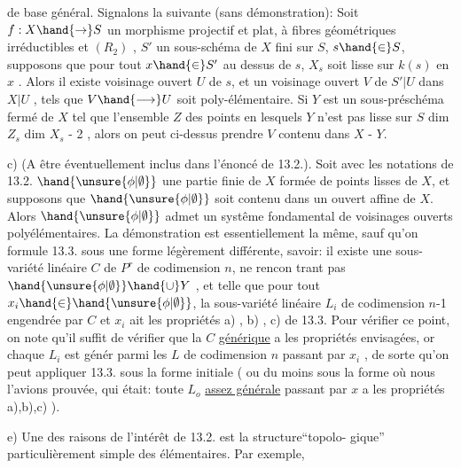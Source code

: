 
de base général. Signalons la suivante (sans démonstration): Soit $f:X\hand{\to} S$
un morphisme projectif et plat,  à fibres géométriques
 irréductibles et $(R_2)$ , $S'$ un sous-schéma de $X$ fini sur $S$,
$s\hand{\in} S$, supposons que pour tout $x\hand{\in} S'$ au dessus de $s$, $X_s$ soit lisse sur
$k(s)$ en $x$ . Alors il existe  voisinage ouvert $U$ de $s$, et un voisinage
ouvert $V$ de $S'|U$ dans $X|U$ , tels que $V\hand{\longrightarrow} U$ soit poly-élémentaire.
Si $Y$ est un sous-préschéma fermé de $X$ tel que l'ensemble $Z$ des points
en lesquels $Y$ n'est pas lisse sur $S$   
dim $Z_s$ \hand{$\leq$} dim $X_s$ - 2 , alors on peut ci-dessus prendre $V$ contenu dans
$X$ - $Y$.

c) (A être éventuellement inclus dans l'énoncé de 13.2.). Soit
avec les notations de 13.2. $\hand{\unsure{\phi|\emptyset}}$ une partie finie de $X$ formée de points
lisses de $X$, et supposons que $\hand{\unsure{\phi|\emptyset}}$ soit contenu dans un  ouvert affine
de $X$. Alors $\hand{\unsure{\phi|\emptyset}}$ admet un systême fondamental de voisinages ouverts
polyélémentaires.  La démonstration est essentiellement la même, sauf
qu'on formule 13.3. sous une forme légèrement différente, savoir: il
existe une sous-variété linéaire $C$ de $P^r$ de codimension $n$, ne rencon%
trant pas $\hand{\unsure{\phi|\emptyset}}\hand{\cup} Y$ , et telle que pour tout $x_i\hand{\in}\hand{\unsure{\phi|\emptyset}}$, la sous-variété
linéaire $L_i$ de codimension $n$-1 engendrée par $C$ et $x_i$ ait les propriétés
a) , b) , c) de 13.3. Pour vérifier ce point, on note qu'il suffit de
vérifier que la $C$ \uline{générique} a les propriétés envisagées, or  
 chaque $L_i$ est génér parmi les $L$ de codimension $n$ passant
par $x_i$ , de sorte qu'on peut appliquer 13.3. sous la forme initiale
( ou du moins sous la forme où nous l'avions prouvée, qui était: toute
$L_o$ \uline{assez générale} passant par $x$ a les propriétés a),b),c) ).

e) Une des raisons de l'intérêt de 13.2. est la structure``topolo-%
gique'' particulièrement simple des   élémentaires. Par exemple,

